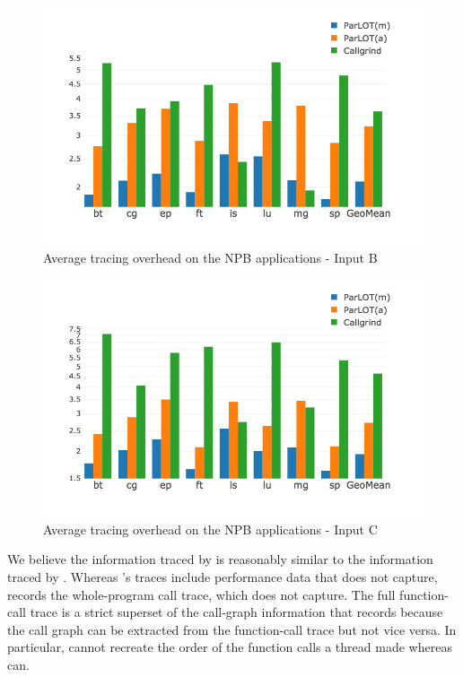 \begin{figure}[b]
\centering
\includegraphics[width=.75\textwidth]{parlot/figs.comet.newMed/comet_chartAvg_sd_B_p3_5.png}
\caption{Average tracing overhead on the NPB applications - Input B}
\label{comet_chartAvg_sd_B_p3_5}
\end{figure}

\begin{figure}[b]
\centering
\includegraphics[width=.75\textwidth]{parlot/figs.comet.newMed/comet_chartAvg_sd_C_p3_5.png}
\caption{ Average tracing overhead on the NPB applications - Input C}
\label{comet_chartAvg_sd_C_p3_5}
\end{figure}


We believe the information traced by \callgrind is reasonably similar to the information traced by \parlotm.
%
Whereas \callgrind 's traces include performance data that \parlot does not capture, \parlot records the whole-program call trace, which \callgrind does not capture.
%
The full function-call trace is a strict superset of the call-graph information that \callgrind records because the call graph can be extracted from the function-call trace but not vice versa.
%
In particular, \callgrind cannot recreate the order of the function calls a thread made whereas \parlot can.
